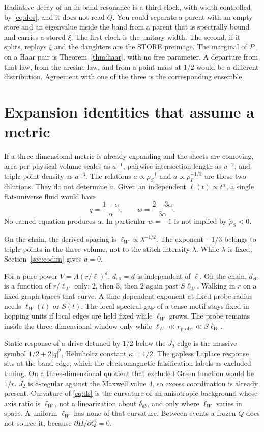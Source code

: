 Radiative decay of an in-band resonance is a third clock, with width
controlled by \eqref{eq:dos}, and it does not read \(Q\).
You could separate a parent with an empty store and an eigenvalue inside
the band from a parent that is spectrally bound and carries a stored
\(\xi\).
The first clock is the unitary width.
The second, if it splits, replays \(\xi\) and the daughters are the STORE
preimage.
The marginal of \(P_-\) on a Haar pair is Theorem~\ref{thm:haar},
with no free parameter.
A departure from that law, from the arcsine law, and from a point mass at
\(1/2\) would be a different distribution.
Agreement with one of the three is the corresponding ensemble.

\section{Expansion identities that assume a metric}
\label{sec:expand}

If a three-dimensional metric is already expanding and the sheets are
comoving, area per physical volume scales as \(a^{-1}\),
pairwise intersection length as \(a^{-2}\),
and triple-point density as \(a^{-3}\).
The relations \(a\propto\rho_S^{-1}\) and \(a\propto\rho_I^{-1/3}\)
are those two dilutions.
They do not determine \(\ddot a\).
Given an independent \(\ell(t)\propto t^\alpha\),
a single flat-universe fluid would have
\[
q=\frac{1-\alpha}{\alpha},\qquad
w=\frac{2-3\alpha}{3\alpha}.
\]
No earned equation produces \(\alpha\).
In particular \(w=-1\) is not implied by \(\dot\rho_S<0\).

On the chain, the derived spacing is \(\ell_W\propto\lambda^{-1/2}\).
The exponent \(-1/3\) belongs to triple points in the three-volume,
not to the stitch intensity \(\lambda\).
While \(\lambda\) is fixed, Section~\ref{sec:codim} gives \(\dot a=0\).

For a pure power \(V=A(r/\ell)^d\),
\(d_{\mathrm{eff}}=d\) is independent of \(\ell\).
On the chain, \(d_{\mathrm{eff}}\) is a function of \(r/\ell_W\) only:
\(2\), then \(3\), then \(2\) again past \(S\ell_W\).
Walking in \(r\) on a fixed graph traces that curve.
A time-dependent exponent at fixed probe radius needs \(\ell_W(t)\) or \(S(t)\).
The local spectral gap of a tense motif stays fixed in hopping units if
local edges are held fixed while \(\ell_W\) grows.
The probe remains inside the three-dimensional window only while
\(\ell_W\ll r_{\mathrm{probe}}\ll S\ell_W\).

Static response of a drive detuned by \(1/2\) below the \(J_2\) edge is the
massive symbol \(1/2+2|q|^2\), Helmholtz constant \(\kappa=1/2\).
The gapless Laplace response sits at the band edge, which the
electromagnetic falsification labels as excluded tuning.
On a three-dimensional quotient that excluded Green function would be
\(1/r\).
\(J_2\) is \(8\)-regular against the Maxwell value \(4\), so excess
coordination is already present.
Curvature of \eqref{eq:ds} is the curvature of an anisotropic background
whose axis ratio is \(\ell_W\), not a linearization about \(\delta_{ab}\),
and only where \(\ell_W\) varies in space.
A uniform \(\ell_W\) has none of that curvature.
Between events a frozen \(Q\) does not source it, because
\(\partial H/\partial Q=0\).

